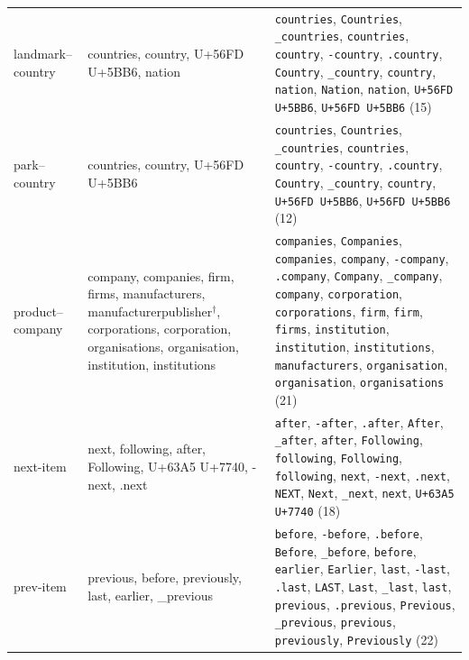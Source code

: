 \begin{center}
\begin{tabular}{@{}l>{\raggedright}p{}>{\raggedright\arraybackslash}p{}@{}}
landmark--country & countries, country, \textrm{U+56FD} \textrm{U+5BB6}, nation & \texttt{\textvisiblespace{}countries}, \texttt{Countries}, \texttt{\_countries}, \texttt{countries}, \texttt{\textvisiblespace{}country}, \texttt{-country}, \texttt{.country}, \texttt{Country}, \texttt{\_country}, \texttt{country}, \texttt{\textvisiblespace{}nation}, \texttt{Nation}, \texttt{nation}, \texttt{\textvisiblespace{}\textrm{U+56FD} \textrm{U+5BB6}}, \texttt{\textrm{U+56FD} \textrm{U+5BB6}} (15) \\[2pt]
park--country & countries, country, \textrm{U+56FD} \textrm{U+5BB6} & \texttt{\textvisiblespace{}countries}, \texttt{Countries}, \texttt{\_countries}, \texttt{countries}, \texttt{\textvisiblespace{}country}, \texttt{-country}, \texttt{.country}, \texttt{Country}, \texttt{\_country}, \texttt{country}, \texttt{\textvisiblespace{}\textrm{U+56FD} \textrm{U+5BB6}}, \texttt{\textrm{U+56FD} \textrm{U+5BB6}} (12) \\[2pt]
product--company & company, companies, firm, firms, manufacturers, manufacturerpublisher$^\dagger$, corporations, corporation, organisations, organisation, institution, institutions & \texttt{\textvisiblespace{}companies}, \texttt{Companies}, \texttt{companies}, \texttt{\textvisiblespace{}company}, \texttt{-company}, \texttt{.company}, \texttt{Company}, \texttt{\_company}, \texttt{company}, \texttt{\textvisiblespace{}corporation}, \texttt{\textvisiblespace{}corporations}, \texttt{\textvisiblespace{}firm}, \texttt{firm}, \texttt{\textvisiblespace{}firms}, \texttt{\textvisiblespace{}institution}, \texttt{institution}, \texttt{\textvisiblespace{}institutions}, \texttt{\textvisiblespace{}manufacturers}, \texttt{\textvisiblespace{}organisation}, \texttt{organisation}, \texttt{\textvisiblespace{}organisations} (21) \\[2pt]
next-item & next, following, after, Following, \textrm{U+63A5} \textrm{U+7740}, -next, .next & \texttt{\textvisiblespace{}after}, \texttt{-after}, \texttt{.after}, \texttt{After}, \texttt{\_after}, \texttt{after}, \texttt{\textvisiblespace{}Following}, \texttt{\textvisiblespace{}following}, \texttt{Following}, \texttt{following}, \texttt{\textvisiblespace{}next}, \texttt{-next}, \texttt{.next}, \texttt{NEXT}, \texttt{Next}, \texttt{\_next}, \texttt{next}, \texttt{\textrm{U+63A5} \textrm{U+7740}} (18) \\[2pt]
prev-item & previous, before, previously, last, earlier, \_previous & \texttt{\textvisiblespace{}before}, \texttt{-before}, \texttt{.before}, \texttt{Before}, \texttt{\_before}, \texttt{before}, \texttt{\textvisiblespace{}earlier}, \texttt{Earlier}, \texttt{\textvisiblespace{}last}, \texttt{-last}, \texttt{.last}, \texttt{LAST}, \texttt{Last}, \texttt{\_last}, \texttt{last}, \texttt{\textvisiblespace{}previous}, \texttt{.previous}, \texttt{Previous}, \texttt{\_previous}, \texttt{previous}, \texttt{\textvisiblespace{}previously}, \texttt{Previously} (22) \\[2pt]

\end{tabular}
\end{center}
